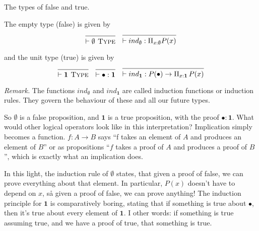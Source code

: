 \documentclass[a4paper, 12pt]{article}
\newcommand{\type}{\textsc{ Type}}
\theoremstyle{changedot}
\theoremstyle{changedotbreak}
\theoremstyle{nonumberplain}
\begin{document}
\begin{definition}
  The types of false and true.

  The empty type (false) is given by
\begin{align*}
  \begin{prooftree}
    \infer0{\vdash \emptyset \type}
  \end{prooftree} & &
  \begin{prooftree}
    \infer0{\vdash ind_{\emptyset} : \Pi_{x:\emptyset} P(x)}
  \end{prooftree}
\end{align*}

and the unit type (true) is given by
\begin{align*}
  \begin{prooftree}
    \infer0{\vdash \mathbf{1} \type}
  \end{prooftree} & &
                    \begin{prooftree}
                      \infer0{\vdash \bullet : \mathbf 1}
                      \end{prooftree}& &
                      \begin{prooftree}
                        \infer0{\vdash ind_{\mathbf 1} : P(\bullet) \to \Pi_{x : \mathbf 1}\, P(x)}
                      \end{prooftree}
  \end{align*}

\end{definition}
\textit{Remark.} The functions $ind_{\emptyset}$ and $ind_{\mathbf 1}$ are called induction functions or induction rules. They govern the behaviour of these and all our future types.

So $\emptyset$ is a false proposition, and $\mathbf 1$ is a true proposition, with the proof $\bullet : \mathbf 1$. What would other logical operators look like in this interpretation? Implication simply becomes a function. $f : A \to B$ says ``f takes an element of $A$ and produces an element of $B$'' or as propositions ``$f$ takes a proof of $A$ and produces a proof of $B$'', which is exactly what an implication does.

In this light, the induction rule of $\emptyset$ states, that given a proof of false, we can prove everything about that element. In particular, $P(x)$ doesn't have to depend on $x$, så given a proof of false, we can prove anything! The induction principle for $\mathbf 1$ is comparatively boring, stating that if something is true about $\bullet$, then it's true about every element of $\mathbf 1$. I other words: if something is true assuming true, and we have a proof of true, that something is true.
\end{document}
